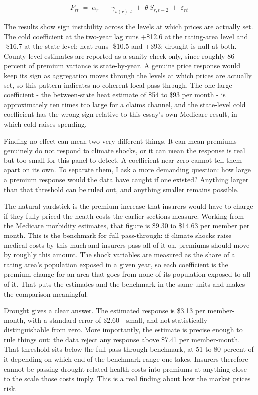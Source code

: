 \documentclass[a4paper,11pt]{article}
\begin{document}
\begin{equation}
P_{rt} \;=\; \alpha_r \;+\; \gamma_{s(r),t} \;+\; \theta \, \bar{S}_{r,t-2} \;+\; \varepsilon_{rt}
\label{eq:passthrough}
\end{equation}

The results show sign instability across the levels at which prices are actually set. The cold coefficient at the two-year lag runs +\$12.6 at the rating-area level and -\$16.7 at the state level; heat runs -\$10.5 and +\$93; drought is null at both. County-level estimates are reported as a sanity check only, since roughly 86 percent of premium variance is state-by-year. A genuine price response would keep its sign as aggregation moves through the levels at which prices are actually set, so this pattern indicates no coherent local pass-through. The one large coefficient - the between-state heat estimate of \$54 to \$93 per month - is approximately ten times too large for a claims channel, and the state-level cold coefficient has the wrong sign relative to this essay's own Medicare result, in which cold raises spending.

Finding no effect can mean two very different things. It can mean premiums genuinely do not respond to climate shocks, or it can mean the response is real but too small for this panel to detect. A coefficient near zero cannot tell them apart on its own. To separate them, I ask a more demanding question: how large a premium response would the data have caught if one existed? Anything larger than that threshold can be ruled out, and anything smaller remains possible.

The natural yardstick is the premium increase that insurers would have to charge if they fully priced the health costs the earlier sections measure. Working from the Medicare morbidity estimates, that figure is \$9.30 to \$14.63 per member per month. This is the benchmark for full pass-through: if climate shocks raise medical costs by this much and insurers pass all of it on, premiums should move by roughly this amount. The shock variables are measured as the share of a rating area's population exposed in a given year, so each coefficient is the premium change for an area that goes from none of its population exposed to all of it. That puts the estimates and the benchmark in the same units and makes the comparison meaningful.

Drought gives a clear answer. The estimated response is \$3.13 per member-month, with a standard error of \$2.60 - small, and not statistically distinguishable from zero. More importantly, the estimate is precise enough to rule things out: the data reject any response above \$7.41 per member-month. That threshold sits below the full pass-through benchmark, at 51 to 80 percent of it depending on which end of the benchmark range one takes. Insurers therefore cannot be passing drought-related health costs into premiums at anything close to the scale those costs imply. This is a real finding about how the market prices risk.
\end{document}
